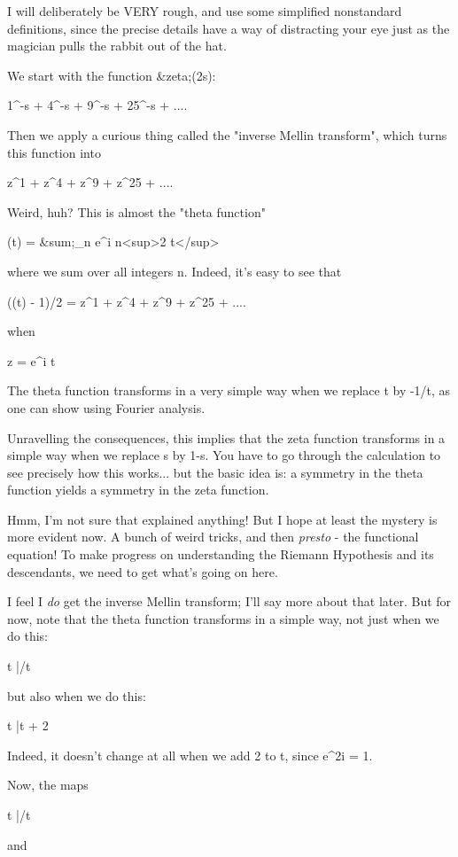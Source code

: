 I will deliberately be VERY rough, and use some simplified nonstandard
definitions, since the precise details have a way of distracting your 
eye just as the magician pulls the rabbit out of the hat.

We start with the function &zeta;(2s):

1^{-s} + 4^{-s} + 9^{-s} + 25^{-s} + ....

Then we apply a curious thing called the "inverse
Mellin transform", which turns 
this function into 

z^{1}  + z^{4}  + z^{9}  + z^{25} + ....

Weird, huh?  This is almost the "theta function"

\theta (t) = &sum;_{n} e^{\pi  i n<sup>2} t</sup>

where we sum over all integers n.  Indeed, it's easy to see that

(\theta (t) - 1)/2 = z^{1} + z^{4} + z^{9} + 
z^{25} + .... 

when 

z = e^{\pi  i t}

The theta function transforms in a very simple way when we replace
t by -1/t, as one can show using Fourier analysis.

Unravelling the consequences, this implies that the zeta function 
transforms in a simple way when we replace s by 1-s.  You have to
go through the calculation to see precisely how this works... but 
the basic idea is: a symmetry in the theta function yields a symmetry
in the zeta function.

Hmm, I'm not sure that explained anything!  But I hope at least the 
mystery is more evident now.  A bunch of weird tricks, and then 
\emph{presto} - 
the functional equation!  To make progress on understanding the Riemann 
Hypothesis and its descendants, we need to get what's going on here.  

I feel I \emph{do} get the inverse
Mellin transform; I'll say more about that later.  
But for now, note that the theta function transforms in a simple way, not 
just when we do this:
 
t |/t

but also when we do this:

t |\to  t + 2

Indeed, it doesn't change at all when we add 2 to t, since e^{2\pi  i} = 1.   

Now, the maps

t |/t

and 

